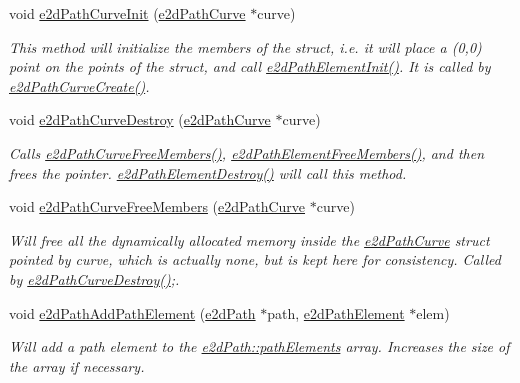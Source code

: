 \begin{DoxyCompactItemize}
void \hyperlink{group__e2dPath_gaabc13050ca8ad5b9b6d0a4a320ddfab0}{e2d\-Path\-Curve\-Init} (\hyperlink{structe2dPathCurve}{e2d\-Path\-Curve} $\ast$curve)
\begin{DoxyCompactList}\small\item\em This method will initialize the members of the struct, i.\-e. it will place a (0,0) point on the points of the struct, and call \hyperlink{group__e2dPath_ga9d46085324faa70a4bc9134c5bb6f5ad}{e2d\-Path\-Element\-Init()}. It is called by \hyperlink{group__e2dPath_ga2f7a9487dd9b3b90537bfb0a462c72b1}{e2d\-Path\-Curve\-Create()}. \end{DoxyCompactList}\item 
void \hyperlink{group__e2dPath_ga2ccac0ccd19b344623ad4872a961cb55}{e2d\-Path\-Curve\-Destroy} (\hyperlink{structe2dPathCurve}{e2d\-Path\-Curve} $\ast$curve)
\begin{DoxyCompactList}\small\item\em Calls \hyperlink{group__e2dPath_gaaa9cd20bddad2ac1e3607e864c547d31}{e2d\-Path\-Curve\-Free\-Members()}, \hyperlink{group__e2dPath_ga38c8b4fad1e211dc5ecf36e04835edb4}{e2d\-Path\-Element\-Free\-Members()}, and then frees the pointer. \hyperlink{group__e2dPath_ga2432949311d4f4a1df98e24d28814fee}{e2d\-Path\-Element\-Destroy()} will call this method. \end{DoxyCompactList}\item 
void \hyperlink{group__e2dPath_gaaa9cd20bddad2ac1e3607e864c547d31}{e2d\-Path\-Curve\-Free\-Members} (\hyperlink{structe2dPathCurve}{e2d\-Path\-Curve} $\ast$curve)
\begin{DoxyCompactList}\small\item\em Will free all the dynamically allocated memory inside the \hyperlink{structe2dPathCurve}{e2d\-Path\-Curve} struct pointed by curve, which is actually none, but is kept here for consistency. Called by \hyperlink{group__e2dPath_ga2ccac0ccd19b344623ad4872a961cb55}{e2d\-Path\-Curve\-Destroy()};. \end{DoxyCompactList}\item 
void \hyperlink{group__e2dPath_ga40a7b291355ce66fed4e4bcb084aa95e}{e2d\-Path\-Add\-Path\-Element} (\hyperlink{structe2dPath}{e2d\-Path} $\ast$path, \hyperlink{structe2dPathElement}{e2d\-Path\-Element} $\ast$elem)
\begin{DoxyCompactList}\small\item\em Will add a path element to the \hyperlink{structe2dPath_ac0c8a45ff4f8d02e557fb33887743439}{e2d\-Path\-::path\-Elements} array. Increases the size of the array if necessary. \end{DoxyCompactList}\item 

\end{DoxyCompactItemize}
